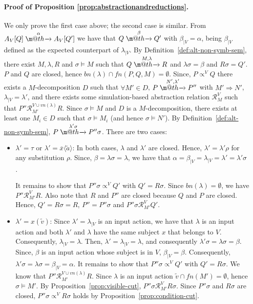 \documentclass[submission,copyright,creativecommons]{eptcs}
\makeatletter
\newcommand{\outp}[2]{\overline{#1}\langle{#2}\rangle}
\newcommand{\inp}[2]{#1(#2)}
\newcommand{\fn}{\mathit{fn}}
\newcommand{\bn}{\mathit{bn}}
\newcommand{\vn}{\mathit{vn}}
\newcommand{\tuple}[1]{\widetilde{#1}}
\newcommand{\tr}[1]{\stackrel{#1}{\rightarrowfill}}
\def \rightarrowfill{\m@th\mathord{\smash-}\mkern-6mu\cleaders\hbox{$\mkern-2mu\mathord{\smash-}\mkern-2mu$}\hfill
  \mkern-6mu\mathord\rightarrow}
\makeatother
\begin{document}
\paragraph{Proof of Proposition \ref{prop:abstractionandreductions}.} 
We only prove the first case above; the second case is similar. 
From $A_V[Q] \tr{\alpha} A_V[Q']$ we have that $Q\tr {\beta} Q'$ with $\beta_{|V} =\alpha$,  being $\beta_{|V}$ defined as the expected counterpart of $\lambda_{|V}$.
By Definition~\ref{def:alt-non-symb-sem},  there exist $M, \lambda, R$ and $\sigma\models M$ 
such that $Q\tr{M,\lambda} R$ and $\lambda\sigma = \beta$ and $R\sigma = Q'$. $P$ and $Q$ are closed, hence
$\bn(\lambda)\cap \fn(P,Q,M) = \emptyset$. Since, $P\propto^V Q$ there exists a $M$-decomposition $D$
such that $\forall M' \in D$, $P\tr{N',\lambda'} P''$ with $M'\Rightarrow N'$, $\lambda_{|V} = \lambda'$,
and there exists some simulation-based abstraction relation  $\mathcal{R}^V_M$ such that 
$P'' \mathcal{R}^{V\cup \vn(\lambda)}_{M'} R$.   Since $\sigma\models M$ and $D$ is a $M$-decomposition, 
there exists at least one $M_i\in D$ such that $\sigma\models M_i$ (and hence $\sigma\models N'$). 
By Definition~\ref{def:alt-non-symb-sem},
$P\tr{\lambda'\sigma} P''\sigma$. There are two cases:
\begin{itemize}
   \item $\lambda' = \tau$ or $\lambda' = \outp{x}{\tuple{a}}$: In both cases, 
   $\lambda$ and $\lambda'$ are closed. Hence, $\lambda' = \lambda'\rho$  
   for any substitution $\rho$. Since, $\beta = \lambda\sigma = \lambda$, we have that $\alpha = \beta_{|V} = \lambda_{|V} = 
   \lambda' = \lambda'\sigma$ .
   
   It remains to show that $P''\sigma\propto^V Q'$ with $Q' = R\sigma$. Since $\bn(\lambda) = \emptyset$, we have $P'' \mathcal{R}^{V}_{M'} R$.
   Also note that $R$ and $P''$ are closed because $Q$ and $P$ are closed. Hence, $Q' = R\sigma = R$, $P'' = P''\sigma$     and $P'' \sigma \mathcal{R}^{V}_{M'} Q'$.
\item $\lambda' = \inp{x}{\tuple{v}}$:  Since $\lambda' = \lambda_{|V}$ is an input action, we have that $\lambda$ is an input action and 
   both $\lambda'$ and $\lambda$ have the same subject $x$ that belongs to $V$. Consequently,
   $\lambda_{|V} = \lambda$. Then, $\lambda' = \lambda_{|V} = \lambda$, and consequently
   $\lambda'\sigma = \lambda \sigma = \beta$. Since, $\beta$ is an input action whose subject is in $V$, $\beta_{|V} = \beta$. Consequently,
   $\lambda'\sigma = \lambda\sigma = \beta_{|V} = \alpha$.
   It remains to show that $P''\sigma \propto^V Q'$ with $Q' = R\sigma$. We know that $P'' \mathcal{R}^{V\cup \vn(\lambda)}_{M'} R$. Since
   $\lambda$ is an input action $\tuple{v}\cap\fn(M') =\emptyset$, hence $\sigma\models M'$. By Proposition~\ref{prop:visible-cut},
   $P''\sigma \mathcal{R}^{V}_{M'} R\sigma$. Since $P''\sigma$ and $R\sigma$ are closed, $P''\sigma \propto^{V} R\sigma$ holds by Proposition~\ref{prop:condition-cut}.
\end{itemize}
\end{document}
